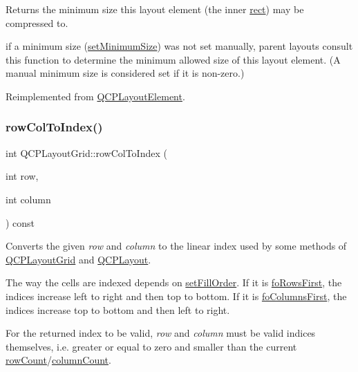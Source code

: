 Returns the minimum size this layout element (the inner \hyperlink{class_q_c_p_layout_element_a208effccfe2cca4a0eaf9393e60f2dd4}{rect}) may be compressed to.

if a minimum size (\hyperlink{class_q_c_p_layout_element_a5dd29a3c8bc88440c97c06b67be7886b}{set\+Minimum\+Size}) was not set manually, parent layouts consult this function to determine the minimum allowed size of this layout element. (A manual minimum size is considered set if it is non-\/zero.) 

Reimplemented from \hyperlink{class_q_c_p_layout_element_ab3fdb5c9a5189bb2dac10d4d25329cd8}{Q\+C\+P\+Layout\+Element}.

\mbox{\label{class_q_c_p_layout_grid_a682ba76f130810ffd294032a1bfbcfcb}} 
\subsubsection{\texorpdfstring{row\+Col\+To\+Index()}{rowColToIndex()}}
{\footnotesize\ttfamily int Q\+C\+P\+Layout\+Grid\+::row\+Col\+To\+Index (\begin{DoxyParamCaption}\item[{int}]{row,  }\item[{int}]{column }\end{DoxyParamCaption}) const}

Converts the given {\itshape row} and {\itshape column} to the linear index used by some methods of \hyperlink{class_q_c_p_layout_grid}{Q\+C\+P\+Layout\+Grid} and \hyperlink{class_q_c_p_layout}{Q\+C\+P\+Layout}.

The way the cells are indexed depends on \hyperlink{class_q_c_p_layout_grid_affc2f3cfd22f28698c5b29b960d2a391}{set\+Fill\+Order}. If it is \hyperlink{class_q_c_p_layout_grid_a7d49ee08773de6b2fd246edfed353ccaa727502c945b524b47b6a727429ecc198}{fo\+Rows\+First}, the indices increase left to right and then top to bottom. If it is \hyperlink{class_q_c_p_layout_grid_a7d49ee08773de6b2fd246edfed353ccaab17e416e3f51ccb897694a3aec6b86b8}{fo\+Columns\+First}, the indices increase top to bottom and then left to right.

For the returned index to be valid, {\itshape row} and {\itshape column} must be valid indices themselves, i.\+e. greater or equal to zero and smaller than the current \hyperlink{class_q_c_p_layout_grid_a19c66fd76cbce58a8e94f33797e0c0aa}{row\+Count}/\hyperlink{class_q_c_p_layout_grid_a1a2962cbf45011405b64b913afa8e7a2}{column\+Count}.

